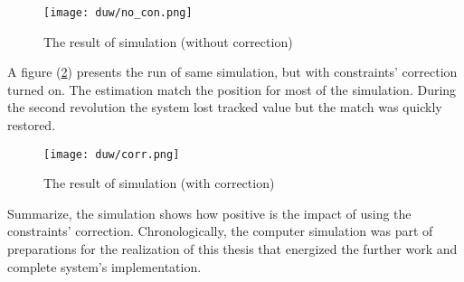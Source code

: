 \begin{figure}[!h]
	\centering
	\texttt{[image: duw/no\_con.png]}
	\caption{The result of simulation (without correction)}
	\label{no_con}
\end{figure}

A figure (\ref{corr}) presents the run of same simulation, but with constraints' correction turned on. 
The estimation match the position for most of the simulation. During the second revolution the system lost tracked value but the match was quickly restored.

\begin{figure}[!h]
	\centering
	\texttt{[image: duw/corr.png]}
	\caption{The result of simulation (with correction)}
	\label{corr}
\end{figure}

\newpage
Summarize, the simulation shows how positive is the impact of using the constraints' correction. Chronologically, the computer simulation was part of preparations for the realization of this thesis that energized the further work and complete system's implementation.